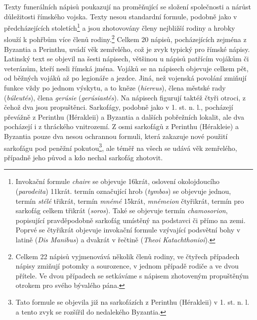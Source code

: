 Texty funerálních nápisů poukazují na proměňující se složení společnosti a nárůst důležitosti římského vojska. Texty nesou standardní formule, podobně jako v předcházejících stoletích\footnote{Invokační formule {\em chaire} se objevuje 16krát, oslovení okolojdoucího ({\em parodeita}) 11krát. termín označující hrob ({\em tymbos}) se objevuje jednou, termín {\em stélé} třikrát, termín {\em mnémé} 15krát, {\em mnémeion} čtyřikrát, termín pro sarkofág celkem třikrát ({\em soros}). Také se objevuje termín {\em chamosorion}, popisující pravděpodobně sarkofág umístěný na podstavci či přímo na zemi. Poprvé se čtyřikrát objevuje invokační formule vzývající podsvětní bohy v latině ({\em Dis Manibus}) a dvakrát v řečtině ({\em Theoi Katachthonioi}).} a jsou zhotovovány členy nejbližší rodiny a hrobky slouží k pohřbům více členů rodiny.\footnote{Celkem 22 nápisů vyjmenovává několik členů rodiny, ve čtyřech případech nápisy zmiňují potomky a sourozence, v jednom případě rodiče a ve dvou přítele. Ve dvou případech se setkáváme s nápisem zhotoveným propuštěným otrokem pro svého bývalého pána.} Celkem 20 nápisů, pocházejících zejména z Byzantia a Perinthu, uvádí věk zemřelého, což je zvyk typický pro římské nápisy. Latinský text se objevil na šesti nápisech, většinou u nápisů patřícím vojákům či veteránům, kteří nesli římská jména. Vojáků se na nápisech objevuje celkem pět, od běžných vojáků až po legionáře a jezdce. Jiná, než vojenská povolání zmiňují funkce vždy po jednom výskytu, a to kněze ({\em hiereus}), člena městské rady ({\em búleutés}), člena {\em gerúsie} ({\em gerúsiastés}). Na nápisech figurují taktéž čtyři otroci, z čehož dva jsou propuštěnci. Sarkofágy, podobně jako v 1. st. n. l., pocházejí převážně z Perinthu (Hérakleii) a Byzantia a dalších pobřežních lokalit, ale dva pocházejí i z thráckého vnitrozemí. Z osmi sarkofágů z Perinthu (Hérakleie) a Byzantia pouze dva nesou ochrannou formuli, která zakazuje nové použití sarkofágu pod peněžní pokutou\footnote{Tato formule se objevila již na sarkofázích z Perinthu (Hérakleii) v 1. st. n. l. a tento zvyk se rozšířil do nedalekého Byzantia.}, ale téměř na všech se udává věk zemřelého, případně jeho původ a kdo nechal sarkofág zhotovit.

